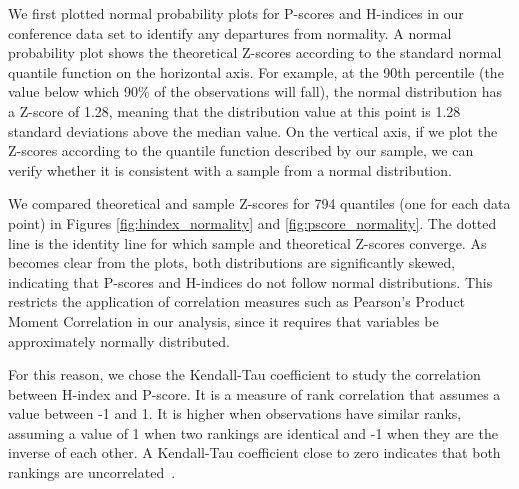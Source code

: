\documentclass[notitlepage]{svjour3}
\begin{document}
We first plotted normal probability plots for P-scores and H-indices in our conference data set 
to identify any departures from normality. A normal probability plot shows the theoretical Z-scores
according to the standard normal quantile function on the horizontal axis. For example, at the 90th
percentile (the value below which 90\% of the observations will fall), the normal distribution has a
Z-score of 1.28, meaning that the distribution value at this point is 1.28 standard deviations above the median value. On the vertical axis, if
we plot the Z-scores according to the quantile function described by our sample, we can verify
whether it is consistent with a sample from a normal distribution.

We compared theoretical and sample Z-scores for 794 quantiles (one for each data point) in Figures
\ref{fig:hindex_normality} and \ref{fig:pscore_normality}. The dotted line is the identity line for
which sample and theoretical Z-scores converge. As becomes clear from the plots, both distributions
are significantly skewed, indicating that P-scores and H-indices do not follow normal
distributions. This restricts the application of correlation measures such as Pearson's Product 
Moment Correlation in our analysis, since it requires that variables be approximately normally 
distributed. 

For this reason, we chose the Kendall-Tau coefficient to
study the correlation 
between H-index and P-score. It is a measure of rank
correlation that assumes a value between
-1 and 1. It is higher when observations have similar
ranks, assuming a value of 1
when two rankings are identical and -1 when they are the inverse of each other. 
A Kendall-Tau coefficient close to zero indicates
that both rankings are uncorrelated~\cite{Kendall1955,Baeza-Yates2011}.
\end{document}

